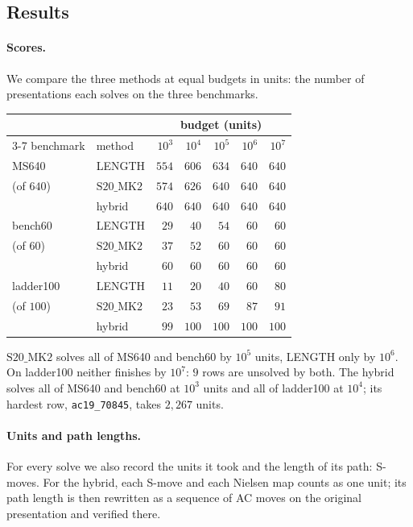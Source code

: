 \documentclass[11pt]{article}
\theoremstyle{definition}
\theoremstyle{remark}
\newcommand{\SMK}{\mathrm{S20\_MK2}}
\begin{document}
\subsection{Results}\label{sec:ac_results}

\paragraph{Scores.} We compare the three methods at equal budgets in units: the number of
presentations each solves on the three benchmarks.
 
\begin{center}
\small
\begin{tabular}{llrrrrr}
\toprule
& & \multicolumn{5}{c}{budget (units)}\\
\cmidrule(lr){3-7}
benchmark & method & $10^3$ & $10^4$ & $10^5$ & $10^6$ & $10^7$\\
\midrule
MS640 & LENGTH & $554$ & $606$ & $634$ & $640$ & $640$\\
(of $640$) & $\SMK$ & $574$ & $626$ & \underline{$640$} & $640$ & $640$\\
& hybrid & \underline{$640$} & \underline{$640$} & \underline{$640$} & $640$ & $640$\\
\midrule
bench60 & LENGTH & $29$ & $40$ & $54$ & $60$ & $60$\\
(of $60$) & $\SMK$ & $37$ & $52$ & \underline{$60$} & $60$ & $60$\\
& hybrid & \underline{$60$} & \underline{$60$} & \underline{$60$} & $60$ & $60$\\
\midrule
ladder100 & LENGTH & $11$ & $20$ & $40$ & $60$ & $80$\\
(of $100$) & $\SMK$ & $23$ & $53$ & $69$ & $87$ & $91$\\
& hybrid & \underline{$99$} & \underline{$100$} & \underline{$100$} & \underline{$100$} & \underline{$100$}\\
\bottomrule
\end{tabular}
 
\end{center}
 
$\SMK$ solves all of MS640 and bench60 by $10^5$ units, LENGTH only by $10^6$. On ladder100 neither finishes by
$10^7$: $9$ rows are unsolved by both. The hybrid solves all of MS640 and bench60 at $10^3$ units and all of
ladder100 at $10^4$; its hardest row, \texttt{ac19\_70845}, takes $2{,}267$ units.
 
\paragraph{Units and path lengths.} For every solve we also record the units it took and the length of its path:
S-moves. For the hybrid, each S-move and each Nielsen map counts as one unit; its path length is then rewritten as a sequence of AC moves on the original presentation and verified there.
 
\end{document}
